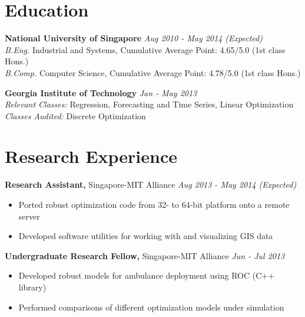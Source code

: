 \documentclass[margin]{res}
\begin{document}
 
\begin{resume}
 


\section{Education} 
{\bf National University of Singapore}  \hfill \textit{Aug 2010 - May 2014 (Expected)} \\
\textit{B.Eng.} Industrial and Systems, Cumulative Average Point: 4.65/5.0 (1st class Hons.) \\
\textit{B.Comp.} Computer Science, Cumulative Average Point: 4.78/5.0 (1st class Hons.)

{\bf Georgia Institute of Technology}  \hfill \textit{Jan - May 2013}\\
\textit{Relevant Classes:} Regression, Forecasting and Time Series, Linear Optimization \\
\textit{Classes Audited:} Discrete Optimization

\section{Research Experience}
{\bf Research Assistant,} Singapore-MIT Alliance \hfill \textit{Aug 2013 - May 2014 (Expected)}
\begin{itemize} \itemsep -2pt  %
\item Ported robust optimization code from 32- to 64-bit platform onto a remote server
\item Developed software utilities for working with and visualizing GIS data
\end{itemize}
 
{\bf Undergraduate Research Fellow,} Singapore-MIT Alliance \hfill \textit{Jun - Jul 2013}
\begin{itemize} \itemsep -2pt %
\item Developed robust models for ambulance deployment using ROC (C++ library)
\item Performed comparisons of different optimization models under simulation
\end{itemize}


\end{resume}
\end{document}
